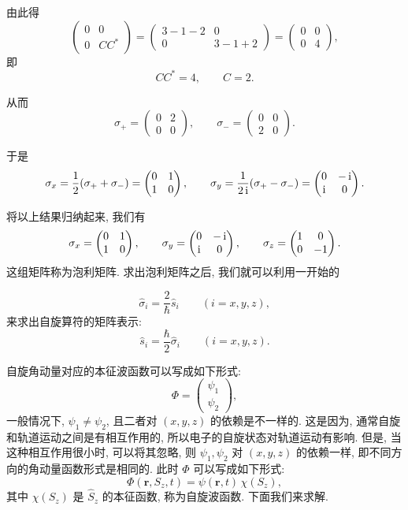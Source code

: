 由此得
\[
\begin{pmatrix}
0 & 0\\
0 & CC^*
\end{pmatrix}
=
\begin{pmatrix}
3-1-2 & 0\\
0 & 3-1+2
\end{pmatrix}
=
\begin{pmatrix}
0 & 0\\
0 & 4
\end{pmatrix},
\]
即
\[
CC^*=4, \qquad C=2 .
\]

从而
\[
\sigma_+
=
\begin{pmatrix}
0 & 2\\
0 & 0
\end{pmatrix},
\qquad
\sigma_-
=
\begin{pmatrix}
0 & 0\\
2 & 0
\end{pmatrix}.
\]

于是
\[
\sigma_x
=
\frac{1}{2}(\sigma_++\sigma_-)
=
\begin{pmatrix}
0 & 1\\
1 & 0
\end{pmatrix},
\qquad
\sigma_y
=
\frac{1}{2\mathop{}\!\mathrm{i}}(\sigma_+-\sigma_-)
=
\begin{pmatrix}
0 & -\mathop{}\!\mathrm{i}\\
\mathop{}\!\mathrm{i} & 0
\end{pmatrix}.
\]

将以上结果归纳起来, 我们有
\[
\sigma_x
=
\begin{pmatrix}
0 & 1\\
1 & 0
\end{pmatrix},
\qquad
\sigma_y
=
\begin{pmatrix}
0 & -\mathop{}\!\mathrm{i}\\
\mathop{}\!\mathrm{i} & 0
\end{pmatrix},
\qquad
\sigma_z
=
\begin{pmatrix}
1 & 0\\
0 & -1
\end{pmatrix}.
\]
这组矩阵称为泡利矩阵. 求出泡利矩阵之后, 我们就可以利用一开始的

\[
\hat{\sigma}_i=\frac{2}{\hbar}\hat{s}_i
\qquad (i=x, y, z),
\]
来求出自旋算符的矩阵表示:
\[
\hat{s}_i
=
\frac{\hbar}{2}\hat{\sigma}_i
\qquad (i=x, y, z).
\]

自旋角动量对应的本征波函数可以写成如下形式:
\[
\Phi = \begin{pmatrix} \psi_1 \\ \psi_2 \end{pmatrix},
\]
一般情况下, $\psi_1 \neq \psi_2$, 且二者对 $(x, y, z)$ 的依赖是不一样的.
这是因为, 通常自旋和轨道运动之间是有相互作用的, 所以电子的自旋状态对轨道运动有影响. 但是, 当这种相互作用很小时, 可以将其忽略, 则 $\psi_1, \psi_2$ 对 $(x, y, z)$ 的依赖一样, 即不同方向的角动量函数形式是相同的. 此时 $\Phi$ 可以写成如下形式:
\[
\Phi(\bm{r}, S_z, t) = \psi(\bm{r}, t) \, \chi(S_z),
\]
其中 $\chi(S_z)$ 是 $\hat{S}_z$ 的本征函数, 称为自旋波函数. 下面我们来求解.


